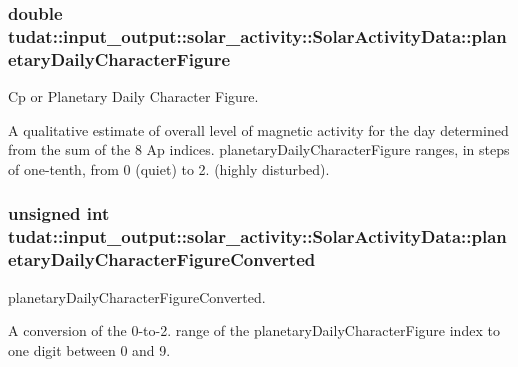 \subsubsection[{\texorpdfstring{planetary\+Daily\+Character\+Figure}{planetaryDailyCharacterFigure}}]{\setlength{\rightskip}{0pt plus 5cm}double tudat\+::input\+\_\+output\+::solar\+\_\+activity\+::\+Solar\+Activity\+Data\+::planetary\+Daily\+Character\+Figure}\hypertarget{structtudat_1_1input__output_1_1solar__activity_1_1SolarActivityData_ac81a017e90b285c6ecc719f2b6a9d0ef}{}\label{structtudat_1_1input__output_1_1solar__activity_1_1SolarActivityData_ac81a017e90b285c6ecc719f2b6a9d0ef}


Cp or Planetary Daily Character Figure. 

A qualitative estimate of overall level of magnetic activity for the day determined from the sum of the 8 Ap indices. planetary\+Daily\+Character\+Figure ranges, in steps of one-\/tenth, from 0 (quiet) to 2. (highly disturbed). 
\subsubsection[{\texorpdfstring{planetary\+Daily\+Character\+Figure\+Converted}{planetaryDailyCharacterFigureConverted}}]{\setlength{\rightskip}{0pt plus 5cm}unsigned int tudat\+::input\+\_\+output\+::solar\+\_\+activity\+::\+Solar\+Activity\+Data\+::planetary\+Daily\+Character\+Figure\+Converted}\hypertarget{structtudat_1_1input__output_1_1solar__activity_1_1SolarActivityData_aa33e92327423b0d5d5f03446c8c1c6eb}{}\label{structtudat_1_1input__output_1_1solar__activity_1_1SolarActivityData_aa33e92327423b0d5d5f03446c8c1c6eb}


planetary\+Daily\+Character\+Figure\+Converted. 

A conversion of the 0-\/to-\/2. range of the planetary\+Daily\+Character\+Figure index to one digit between 0 and 9. 
